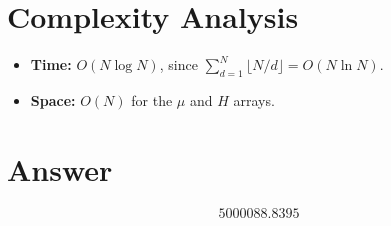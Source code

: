 \documentclass[12pt]{article}
\begin{document}
\section{Complexity Analysis}

\begin{itemize}
\item \textbf{Time:} $O(N \log N)$, since $\sum_{d=1}^{N} \lfloor N/d \rfloor = O(N \ln N)$.
\item \textbf{Space:} $O(N)$ for the $\mu$ and $H$ arrays.
\end{itemize}

\section{Answer}

\[
\boxed{5000088.8395}
\]
\end{document}
